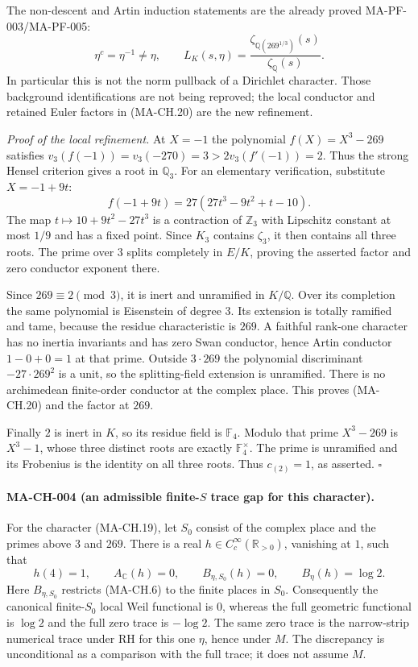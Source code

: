 The non-descent and Artin induction statements are the
already proved MA-PF-003/MA-PF-005:
\[
 \eta^c=\eta^{-1}\ne\eta,
 \qquad
 L_K(s,\eta)=\frac{\zeta_{\mathbb Q(269^{1/3})}(s)}
                         {\zeta_{\mathbb Q}(s)}.
 \tag{MA-CH.21}
\]
In particular this is not the norm pullback of a Dirichlet
character.  Those background identifications are not being
reproved; the local conductor and retained Euler factors
in (MA-CH.20) are the new refinement.

\emph{Proof of the local refinement.}
At $X=-1$ the polynomial $f(X)=X^3-269$ satisfies
$v_3(f(-1))=v_3(-270)=3>2v_3(f'(-1))=2$.
Thus the strong Hensel criterion gives a root in $\mathbb Q_3$.
For an elementary verification, substitute $X=-1+9t$:
\[
       f(-1+9t)=27(27t^3-9t^2+t-10).
\]
The map $t\mapsto10+9t^2-27t^3$ is a contraction of
$\mathbb Z_3$ with Lipschitz constant at most $1/9$ and
has a fixed point.  Since $K_3$ contains $\zeta_3$, it
then contains all three roots.  The prime over $3$ splits
completely in $E/K$, proving the asserted factor and zero
conductor exponent there.

Since $269\equiv2\pmod3$, it is inert and unramified in
$K/\mathbb Q$.  Over its completion the same polynomial
is Eisenstein of degree $3$.  Its extension is totally
ramified and tame, because the residue characteristic is
$269$.  A faithful rank-one character has no inertia
invariants and has zero Swan conductor, hence Artin
conductor $1-0+0=1$ at that prime.  Outside $3\cdot269$
the polynomial discriminant $-27\cdot269^2$ is a unit,
so the splitting-field extension is unramified.  There is
no archimedean finite-order conductor at the complex place.
This proves (MA-CH.20) and the factor at $269$.

Finally $2$ is inert in $K$, so its residue field is
$\mathbb F_4$.  Modulo that prime $X^3-269$ is $X^3-1$,
whose three distinct roots are exactly $\mathbb F_4^\times$.
The prime is unramified and its Frobenius is the identity
on all three roots.  Thus $c_{(2)}=1$, as asserted.
\hfill$\square$

\paragraph{MA-CH-004 (an admissible finite-$S$ trace gap for this character).}
For the character (MA-CH.19), let $S_0$ consist of the complex
place and the primes above $3$ and $269$.
There is a real $h\in C_c^\infty(\mathbb R_{>0})$, vanishing
at $1$, such that
\[
  h(4)=1,\qquad A_{\mathbb C}(h)=0,\qquad
  B_{\eta,S_0}(h)=0,\qquad B_\eta(h)=\log2.
 \tag{MA-CH.22}
\]
Here $B_{\eta,S_0}$ restricts (MA-CH.6) to the finite
places in $S_0$.  Consequently the canonical finite-$S_0$
local Weil functional is $0$, whereas the full geometric
functional is $\log2$ and the full zero trace is $-\log2$.
The same zero trace is the narrow-strip numerical trace
under RH for this one $\eta$, hence under $M$.
The discrepancy is unconditional as a comparison with the
full trace; it does not assume $M$.

